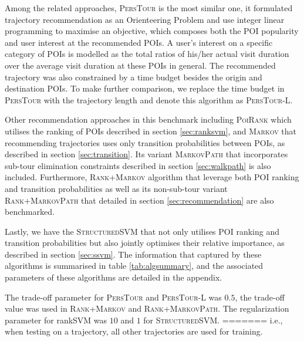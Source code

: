 Among the related approaches, \textsc{PersTour}\cite{ijcai15} is the most similar one, it formulated
trajectory recommendation as an Orienteering Problem and use integer linear programming to maximise
an objective, which composes both the POI popularity and user interest at the recommended POIs.
A user's interest on a specific category of POIs is modelled as the total ratios of his/her actual visit duration
over the average visit duration at these POIs in general.
The recommended trajectory was also constrained by a time budget besides the origin and destination POIs.
To make further comparison, we replace the time budget in \textsc{PersTour} with the trajectory length and
denote this algorithm as \textsc{PersTour-L}.

Other recommendation approaches in this benchmark including \textsc{PoiRank} which utilises the ranking of POIs
described in section \ref{sec:ranksvm}, and \textsc{Markov} that recommending trajectories uses only transition
probabilities between POIs, as described in section \ref{sec:transition}. Its variant \textsc{MarkovPath} that incorporates
sub-tour elimination constraints described in section \ref{sec:walkpath} is also included.
Furthermore, \textsc{Rank+Markov} algorithm that leverage both POI ranking and transition probabilities as well as
its non-sub-tour variant \textsc{Rank+MarkovPath} that detailed in section \ref{sec:recommendation} are also
benchmarked.

Lastly, we have the \textsc{StructuredSVM} that not only utilises POI ranking and transition probabilities but also
jointly optimises their relative importance, as described in section \ref{sec:ssvm}.
The information that captured by these algorithms is summarised in table \ref{tab:algsummary},
and the associated parameters of these algorithms are detailed in the appendix.

The trade-off parameter for \textsc{PersTour} and \textsc{PersTour-L} was $0.5$,
the trade-off value was used in \textsc{Rank+Markov} and \textsc{Rank+MarkovPath}.
The regularization parameter for rankSVM was $10$
and $1$ for \textsc{StructuredSVM}.
=======
i.e., when testing on a trajectory, all other trajectories are used for training.

